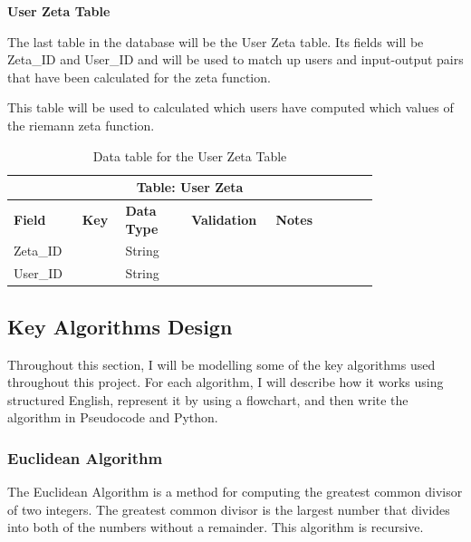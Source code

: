 \documentclass{article}
\begin{document}
\textbf{User Zeta Table}

The last table in the database will be the User Zeta table. Its fields will be Zeta\_ID and User\_ID and will be used to match up users and input-output pairs that have been calculated for the zeta function.

This table will be used to calculated which users have computed which values of the riemann zeta function.

\begin{table}[ht]
    \centering
    \begin{tabular}{ | p{0.15\linewidth} | p{0.1\linewidth} | p{0.16\linewidth} | p{0.14\linewidth} | p{0.25\linewidth} | }
    \hline
    \multicolumn{5}{|c|}{\textbf{Table: User Zeta}}\\
    \hline
    \hline
    \textbf{Field} & \textbf{Key} & \textbf{Data Type} & \textbf{Validation} & \textbf{Notes} \\
    \hline
    Zeta\_ID & & String & & \\
    \hline
    User\_ID & & String & & \\
    \hline
    \end{tabular}
    \caption{Data table for the User Zeta Table}
\end{table}

\clearpage

\subsection{Key Algorithms Design}
Throughout this section, I will be modelling some of the key algorithms used throughout this project. For each algorithm, I will describe how it works using structured English, represent it by using a flowchart, and then write the algorithm in Pseudocode and Python.

\subsubsection{Euclidean Algorithm}
The Euclidean Algorithm is a method for computing the greatest common divisor of two integers. The greatest common divisor is the largest number that divides into both of the numbers without a remainder. This algorithm is recursive.
\end{document}
